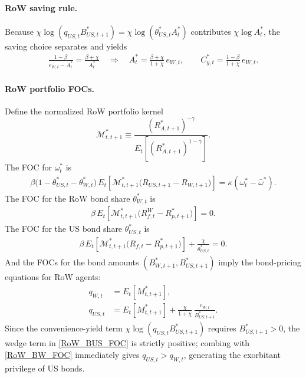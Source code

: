 \documentclass[12pt]{article}
\theoremstyle{plain}
\begin{document}
\paragraph{RoW saving rule.}
Because $\chi\log(q_{US,t}B_{US,t+1}^*)=\chi\log(\theta_{US,t}^*A_t^*)$ contributes $\chi\log A_t^*$,
the saving choice separates and yields
\begin{align}\label{RoW_saving_rule_bond_cost}
\frac{1-\beta}{e_{W,t}-A_t^*}=\frac{\beta+\chi}{A_t^*}
\quad\Rightarrow\quad
A_t^*=\frac{\beta+\chi}{1+\chi}\,e_{W,t},
\qquad
C^*_{y,t}=\frac{1-\beta}{1+\chi}\,e_{W,t}.
\end{align}

\paragraph{RoW portfolio FOCs.}
Define the normalized RoW portfolio kernel
\[
\mathcal M_{t,t+1}^* \equiv \frac{(R_{A,t+1}^*)^{-\gamma}}{E_t\!\left[(R_{A,t+1}^*)^{1-\gamma}\right]}.
\]
The FOC for $\omega_t^*$ is
\begin{align}\label{RoW_omega_FOC_mod}
\beta\bigl(1-\theta_{US,t}^*-\theta_{W,t}^*\bigr)\,
E_t\!\left[\mathcal M_{t,t+1}^*\bigl(R_{US,t+1}-R_{W,t+1}\bigr)\right]
=
\kappa(\omega_t^*-\bar\omega^*).
\end{align}
The FOC for the RoW bond share $\theta_{W,t}^*$ is
\begin{align}\label{RoW_thetaW_FOC_mod}
\beta\,E_t\!\left[\mathcal M_{t,t+1}^*\bigl(R_{f,t}^W-R_{p,t+1}^*\bigr)\right]
=
0.
\end{align}
The FOC for the US bond share $\theta_{US,t}^*$ is
\begin{align}\label{RoW_thetaUS_FOC_mod}
\beta\,E_t\!\left[\mathcal M_{t,t+1}^*\bigl(R_{f,t}-R_{p,t+1}^*\bigr)\right]
+\frac{\chi}{\theta_{US,t}^*}
=
0.
\end{align}
And the FOCs for the bond amounts $(B_{W,t+1}^*,B_{US,t+1}^*)$ imply the bond-pricing equations for RoW agents:
\begin{align}
q_{W,t}&=E_t\!\left[M^*_{t,t+1}\right], \label{RoW_BW_FOC}\\
q_{US,t}&=E_t\!\left[M^*_{t,t+1}\right]
+\frac{\chi}{1+\chi}\,\frac{e_{W,t}}{B^*_{US,t+1}}. \label{RoW_BUS_FOC}
\end{align}
Since the convenience-yield term $\chi\log(q_{US,t}B_{US,t+1}^*)$ requires $B_{US,t+1}^*>0$, the wedge term in
\eqref{RoW_BUS_FOC} is strictly positive; combing with \eqref{RoW_BW_FOC} immediately gives  $q_{US,t}>q_{W,t}$, generating the exorbitant privilege of US bonds.
\end{document}
